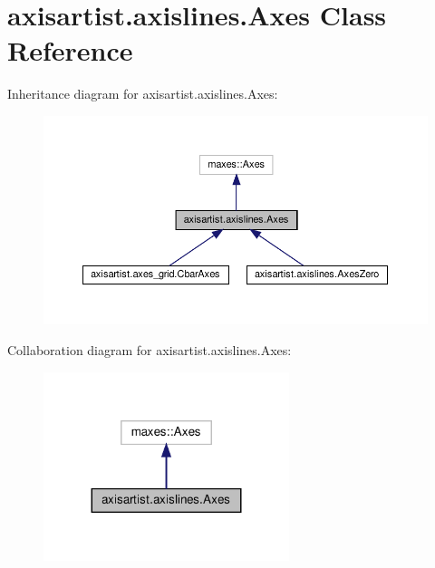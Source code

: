 \hypertarget{classaxisartist_1_1axislines_1_1Axes}{}\section{axisartist.\+axislines.\+Axes Class Reference}
\label{classaxisartist_1_1axislines_1_1Axes}


Inheritance diagram for axisartist.\+axislines.\+Axes\+:
\nopagebreak
\begin{figure}[H]
\begin{center}
\leavevmode
\includegraphics[width=350pt]{classaxisartist_1_1axislines_1_1Axes__inherit__graph}
\end{center}
\end{figure}


Collaboration diagram for axisartist.\+axislines.\+Axes\+:
\nopagebreak
\begin{figure}[H]
\begin{center}
\leavevmode
\includegraphics[width=203pt]{classaxisartist_1_1axislines_1_1Axes__coll__graph}
\end{center}
\end{figure}
